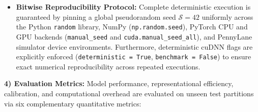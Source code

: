\documentclass[pdflatex,sn-mathphys-num]{sn-jnl}%
\theoremstyle{thmstyleone}%
\theoremstyle{thmstyletwo}%
\theoremstyle{thmstylethree}%
\begin{document}
\begin{itemize}
    \item \textbf{Bitwise Reproducibility Protocol:} Complete deterministic execution is guaranteed by pinning a global pseudorandom seed $\mathcal{S} = 42$ uniformly across the Python \texttt{random} library, NumPy (\texttt{np.random.seed}), PyTorch CPU and GPU backends (\texttt{manual\_seed} and \texttt{cuda.manual\_seed\_all}), and PennyLane simulator device environments. Furthermore, deterministic cuDNN flags are explicitly enforced (\texttt{deterministic = True}, \texttt{benchmark = False}) to ensure exact numerical reproducibility across repeated executions.
\end{itemize}

\textbf{4) Evaluation Metrics:}
Model performance, representational efficiency, calibration, and computational overhead are evaluated on unseen test partitions via six complementary quantitative metrics:
\end{document}

